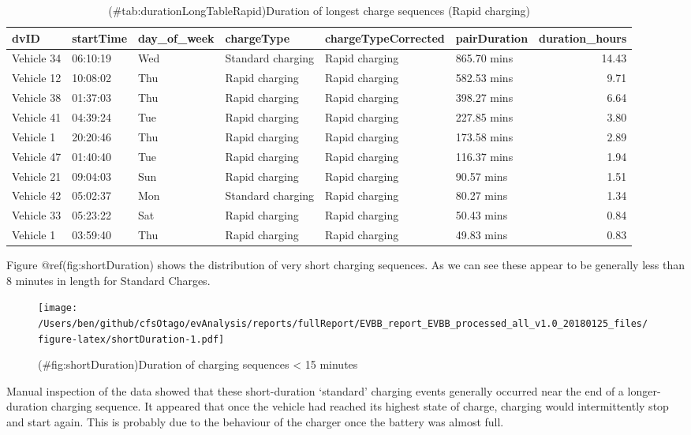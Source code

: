 \documentclass[]{article}
\begin{document}
\begin{table}[t]

\caption{(\#tab:durationLongTableRapid)Duration of longest charge sequences (Rapid charging)}
\centering
\begin{tabular}{l|l|l|l|l|l|r}
\hline
dvID & startTime & day\_of\_week & chargeType & chargeTypeCorrected & pairDuration & duration\_hours\\
\hline
Vehicle 34 & 06:10:19 & Wed & Standard charging & Rapid charging & 865.70 mins & 14.43\\
\hline
Vehicle 12 & 10:08:02 & Thu & Rapid charging & Rapid charging & 582.53 mins & 9.71\\
\hline
Vehicle 38 & 01:37:03 & Thu & Rapid charging & Rapid charging & 398.27 mins & 6.64\\
\hline
Vehicle 41 & 04:39:24 & Tue & Rapid charging & Rapid charging & 227.85 mins & 3.80\\
\hline
Vehicle 1 & 20:20:46 & Thu & Rapid charging & Rapid charging & 173.58 mins & 2.89\\
\hline
Vehicle 47 & 01:40:40 & Tue & Rapid charging & Rapid charging & 116.37 mins & 1.94\\
\hline
Vehicle 21 & 09:04:03 & Sun & Rapid charging & Rapid charging & 90.57 mins & 1.51\\
\hline
Vehicle 42 & 05:02:37 & Mon & Standard charging & Rapid charging & 80.27 mins & 1.34\\
\hline
Vehicle 33 & 05:23:22 & Sat & Rapid charging & Rapid charging & 50.43 mins & 0.84\\
\hline
Vehicle 1 & 03:59:40 & Thu & Rapid charging & Rapid charging & 49.83 mins & 0.83\\
\hline
\end{tabular}
\end{table}

Figure @ref(fig:shortDuration) shows the distribution of very short charging sequences. As we can see these appear to be generally less than 8 minutes in length for Standard Charges.

\begin{figure}
\centering
\texttt{[image: /Users/ben/github/cfsOtago/evAnalysis/reports/fullReport/EVBB\_report\_EVBB\_processed\_all\_v1.0\_20180125\_files/figure-latex/shortDuration-1.pdf]}
\caption{(\#fig:shortDuration)Duration of charging sequences \textless{} 15 minutes}
\end{figure}

Manual inspection of the data showed that these short-duration `standard' charging events generally occurred near the end of a longer-duration charging sequence. It appeared that once the vehicle had reached its highest state of charge, charging would intermittently stop and start again. This is probably due to the behaviour of the charger once the battery was almost full.
\end{document}
